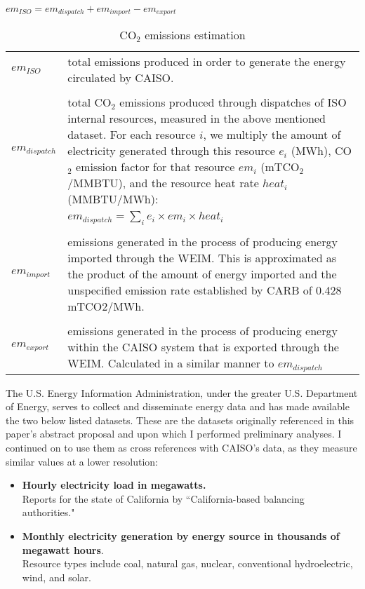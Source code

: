 \documentclass{article}
\begin{document}
\begin{table}[H]
\begin{center}
        \(em_{ISO} = em_{dispatch} + em_{import} - em_{export}\)\\
\end{center}
\vspace{3mm}
    \begin{tabular}{p{2cm}p{8cm}}
        \(em_{ISO}\) & total emissions produced in order to generate the energy circulated by CAISO.\\\\
        \(em_{dispatch}\) & total CO\(_2\) emissions produced through dispatches of ISO internal resources, measured in the above mentioned dataset. For each resource \(i\), we multiply the amount of electricity generated through this resource \(e_i\) (MWh), CO\(_2\) emission factor for that resource \(em_i\) (mTCO\(_2\)/MMBTU), and the resource heat rate \(heat_i\) (MMBTU/MWh):\\
        & \(em_{dispatch} = \sum_{i}e_{i} \times em_{i} \times heat_i\)\\\\
        \(em_{import}\) & emissions generated in the process of producing energy imported through the WEIM. This is approximated as the product of the amount of energy imported and the unspecified emission rate established by CARB of 0.428 mTCO2/MWh.\\\\
        \(em_{export}\) & emissions generated in the process of producing energy within the CAISO system that is exported through the WEIM. Calculated in a similar manner to \(em_{dispatch}\)
    \end{tabular}
    \caption{\label{table:emissionsestimation}CO\(_2\) emissions estimation}
\end{table}

The U.S. Energy Information Administration, under the greater U.S. Department of Energy, serves to collect and disseminate energy data and has made available the two below listed datasets. \citep{eia:energydata} These are the datasets originally referenced in this paper's abstract proposal and upon which I performed preliminary analyses. I continued on to use them as cross references with CAISO's data, as they measure similar values at a lower resolution:

\begin{itemize}
    \item
    \textbf{Hourly electricity load in megawatts.}\\
    Reports for the state of California by ``California-based balancing authorities."
    
    \item
    \textbf{Monthly electricity generation by energy source in thousands of megawatt hours}.\\
    Resource types include coal, natural gas, nuclear, conventional hydroelectric, wind, and solar.
\end{itemize}
\end{document}

